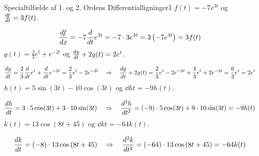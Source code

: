 \begin{opgave}{Specialtilfælde af 1. og 2. Ordens Differentialligninger}{1}
\opg $f(t) = -7e^{3t}$ og $\d{f}{t} = 3f(t)$.

$$\d{f}{x} = -7 \dl{e^{3t}}{t} = -7 \cdot 3 e^{3t} = 3 \left( -7 e^{3t} \right) = 3 f(t)$$
\vspace{2mm}
\opg $g(t) = \frac{2}{3}e^t + e^{-2t}$ og $\d{g}{t} + 2g(t) = 2e^t$.

$$\d{g}{t} = \frac{2}{3} \dl{e^t}{t} + \dl{e^{-2t}}{t} = \frac{2}{3}e^t -2e^{-2t} \quad \Rightarrow \quad \d{g}{t} + 2g(t) = \frac{2}{3}e^t -2e^{-2t} + \frac{4}{3}e^t + 2e^{-2t} = \frac{6}{3} e^t = 2e^t$$
\vspace{2mm}
\opg $h(t) = 5 \sin(3t) - 10\cos(3t)$ og $\dd{h}{t} = -9h(t)$.

$$\d{h}{t} = 3 \cdot 5 \cos(3t) + 3 \cdot 10 \sin(3t) \quad \Rightarrow \quad \dd{h}{t} = (-9) \cdot 5 \cos(3t) + 9 \cdot 10 \sin(3t) = -9 h(t)$$
\vspace{2mm}
\opg $k(t) = 13 \cos \left( 8t + 45 \right)$ og $\dd{k}{t} = -64 k(t)$.

$$\d{k}{t} = (-8) \cdot 13 \cos \left( 8t + 45 \right) \quad \Rightarrow \quad \dd{k}{t} = (-64) \cdot 13 \cos \left( 8t + 45 \right) = -64 k(t)$$
\vspace{2mm}
\end{opgave}


